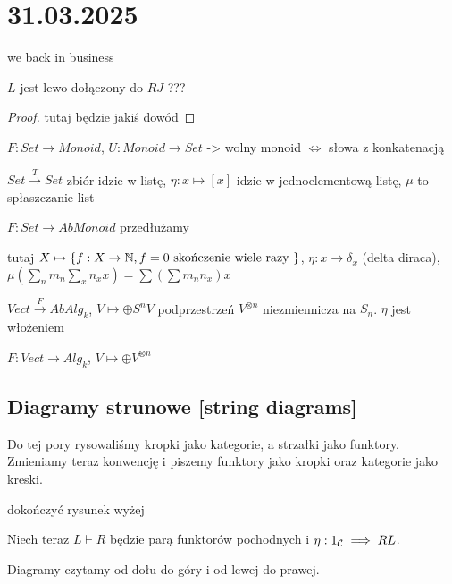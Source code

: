 \section{31.03.2025}{we back in business}

\begin{lemma}{}{}
  $L$ jest lewo dołączony do $RJ$ ???
\end{lemma}

\begin{proof}
  tutaj będzie jakiś dowód
\end{proof}

\begin{example}[m]
  \item $F:Set\to Monoid$, $U:Monoid\to Set$ -> wolny monoid $\iff$ słowa z konkatenacją

    $Set\xrightarrow{T}Set$ zbiór idzie w listę, $\eta:x\mapsto[x]$ idzie w jednoelementową listę, $\mu$ to spłaszczanie list
  \item $F: Set\to AbMonoid$ przedłużamy 

  tutaj $X\mapsto \{f:X\to \mathbb{N}, f=0\text{ skończenie wiele razy }\}$, $\eta:x\to \delta_x$ (delta diraca), $\mu(\sum_nm_n\sum_x n_x x)= \sum(\sum m_nn_x)x$
  \item $Vect\xrightarrow{F}AbAlg_k$, $V\mapsto\oplus S^nV$ podprzestrzeń $V^{\otimes n}$ niezmiennicza na $S_n$. $\eta$ jest włożeniem
  \item $F:Vect\to Alg_k$, $V\mapsto \oplus V^{\otimes n}$
\end{example}


\subsection{Diagramy strunowe [string diagrams]}

Do tej pory rysowaliśmy kropki jako kategorie, a strzałki jako funktory. Zmieniamy teraz konwencję i piszemy funktory jako kropki oraz kategorie jako kreski.

\begin{center}
\end{center}

dokończyć rysunek wyżej


Niech teraz $L\vdash R$ będzie parą funktorów pochodnych i $\eta:1_{\mathcal{C}}\implies RL$.

Diagramy czytamy od dołu do góry i od lewej do prawej.

